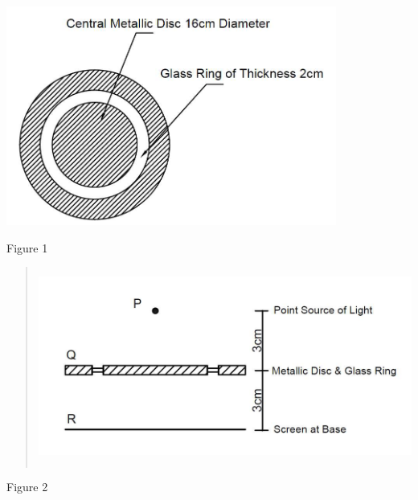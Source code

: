 \documentclass[
]{article}
\begin{document}
\includegraphics[width=4.27083in,height=2.83333in]{vertopal_2361032064654423b71b7db67d98c753/media/image9.png}

Figure 1

\begin{quote}
\includegraphics[width=5.32361in,height=2.55417in]{vertopal_2361032064654423b71b7db67d98c753/media/image10.png}
\end{quote}

Figure 2
\end{document}
